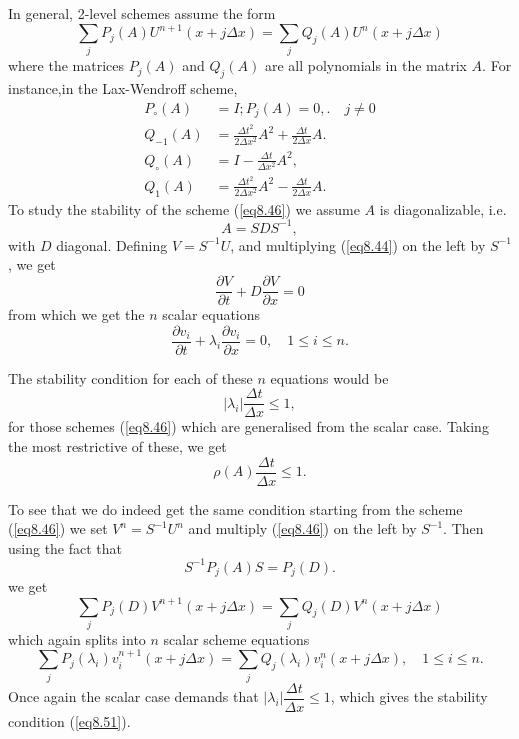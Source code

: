 In general, 2-level schemes assume the form
\begin{equation*}
\sum\limits_j P_j(A) U^{n+1} (x+j\Delta x) = \sum\limits_j Q_j(A) U^n (x+j \Delta x) \tag{8.46}\label{eq8.46}
\end{equation*}
where the matrices $P_j(A)$ and $Q_j(A)$ are all polynomials in the matrix $A$. For instance,\pageoriginale in the Lax-Wendroff scheme,
\begin{align*}
P_\circ(A) & = I ; P_j(A) = 0,. \quad j \neq 0\\
Q_{-1}(A) & = \frac{\Delta t^2}{2\Delta x^2} A^2 + \frac{\Delta t}{2\Delta x} A.\\
Q_\circ (A) & = I - \frac{\Delta t}{\Delta x^2} A^2,\\
Q_1(A) & = \frac{\Delta t^2}{2\Delta x^2} A^2 - \frac{\Delta t}{2\Delta x} A. 
\end{align*}
To study the stability of the scheme (\ref{eq8.46}) we assume $A$ is diagonalizable, i.e.
\begin{equation*}
A = SDS^{-1}, \tag{8.47}\label{eq8.47}
\end{equation*}
with $D$ diagonal. Defining  $V = S^{-1}U$, and multiplying (\ref{eq8.44}) on the left by $S^{-1}$, we get 
\begin{equation*}
\frac{\partial V}{\partial t}  + D \frac{\partial V}{\partial x} = 0
\tag{8.48}\label{eq8.48}
\end{equation*}
from which we get the $n$ scalar equations
\begin{equation*}
\frac{\partial v_i}{\partial t} + \lambda_i \frac{\partial v_i}{\partial x} = 0, \quad 1 \leq i \leq n . \tag{8.49}\label{eq8.49}
\end{equation*}

The stability condition for each of these $n$ equations would be 
\begin{equation*}
|\lambda_i| \frac{\Delta t}{\Delta x} \leq 1, \tag{8.50}\label{eq8.50}
\end{equation*}
for those schemes (\ref{eq8.46}) which are generalised from the scalar case. Taking the most restrictive of these, we get 
\begin{equation*}
\rho  (A) \frac{\Delta t}{\Delta x} \leq 1. \tag{8.51}\label{eq8.51}
\end{equation*}

To see that we do indeed get the same condition starting from the scheme (\ref{eq8.46}) we set $V^n = S^{-1} U^n$ and multiply (\ref{eq8.46}) on the left by $S^{-1}$. Then using the fact that 
$$
S^{-1} P_j (A)S = P_j (D).
$$\pageoriginale
we get
$$
\sum\limits_j P_j (D) V^{n+1} (x+ j \Delta x) = \sum\limits_j Q_j (D) V^n (x+ j\Delta x) 
$$
which again splits into $n$ scalar scheme equations
$$
\sum\limits_j P_j (\lambda_i) v^{n+1}_i (x+ j \Delta x) = \sum\limits_j Q_j (\lambda_i) v^n_i (x+j \Delta x), \quad 1 \leq i \leq n.
$$
Once again the scalar case demands that $|\lambda_i| \dfrac{\Delta t}{\Delta x} \leq 1$, which gives the stability condition (\ref{eq8.51}).

